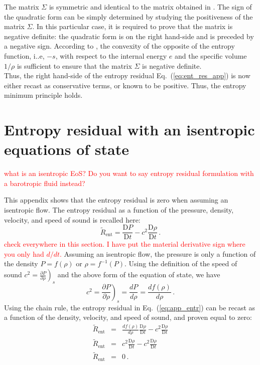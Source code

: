 \documentclass[preprint,10pt]{elsarticle}
\newcommand{\resinew}{\widetilde{R}_\text{ent}}
\newcommand{\matder}[1]{\frac{\textrm{D} #1}{\textrm{D} t}}
\newcommand{\eqt}[1]{Eq.~(\ref{#1})}                     %
\newcommand{\tcr}[1]{\textcolor{red}{#1}}
\begin{document}
%
The matrix $\Sigma$ is symmetric and identical to the matrix obtained in \cite{jlg}. The sign of the quadratic form 
can be simply determined by studying the positiveness of the matrix $\Sigma$. In this particular case, it is required 
to prove that the matrix is negative definite: the quadratic form is on the right hand-side and is preceded by a negative 
sign. According to \cite{jlg}, the convexity of the opposite of the entropy function, i..e, $-s$, with respect to the internal energy $e$ 
and the specific volume $1/ \rho$ is sufficient to ensure that the matrix $\Sigma$ is negative definite. \\
Thus, the right hand-side of the entropy residual \eqt{eq:ent_res_app} is now either recast as conservative terms, 
or known to be positive. Thus, the entropy minimum principle holds.

\newpage
\section{Entropy residual with an isentropic equations of state} \label{app:ise_equ}
\tcr{what is an isentropic EoS? Do you want to say entropy residual formulation with a barotropic fluid instead?}

This appendix shows that the entropy residual is zero when assuming an isentropic flow. The entropy residual as a 
function of the pressure, density, velocity, and speed of sound is recalled here:
%
\begin{equation}\label{eq:app_entr}
\resinew = \matder P - c^2  \matder \rho \,.
\end{equation}
\tcr{check everywhere in this section. I have put the material derivative sign where you only had $d/dt$.}
%
Assuming an isentropic flow, the pressure is only a function of the density $P = f( \rho )$ or $\rho = f^{-1}( P )$. 
Using the definition of the speed of sound $c^2 = \left. \frac{\partial P}{\partial \rho} \right)_s$ and the above 
form of the equation of state, we have
%
\begin{equation}\label{eq:app_sp}
c^2 = \left. \frac{\partial P}{\partial \rho} \right)_s = \frac{d P}{d \rho} = \frac{d f(\rho)}{d \rho} \,.
\end{equation}
%
Using the chain rule, the entropy residual in \eqt{eq:app_entr} can be recast as a function of the density, velocity, 
and speed of sound, and proven equal to zero:
%
\begin{eqnarray*}
\resinew &=& \frac{d f(\rho)}{d \rho}  \matder \rho - c^2  \matder  \rho  \\
\resinew &=& c^2                       \matder \rho - c^2  \matder  \rho  \\
\resinew &=&  0 \,.
\end{eqnarray*}

\end{document}
